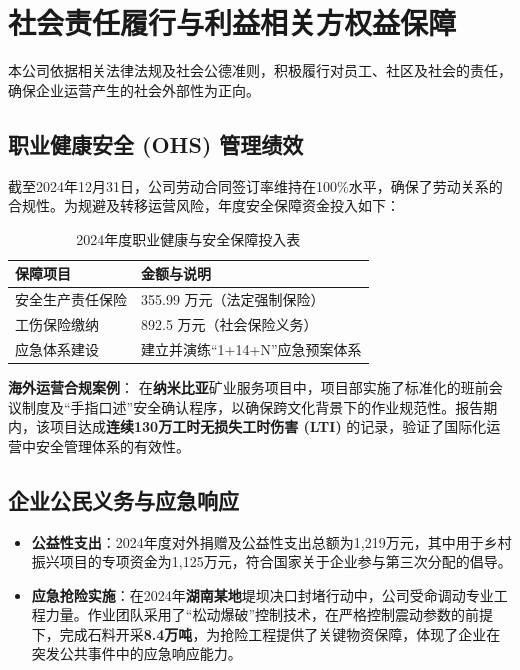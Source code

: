 \documentclass[a4paper,12pt]{article}
\begin{document}
\section{社会责任履行与利益相关方权益保障}

本公司依据相关法律法规及社会公德准则，积极履行对员工、社区及社会的责任，确保企业运营产生的社会外部性为正向。

\subsection{职业健康安全 (OHS) 管理绩效}

截至2024年12月31日，公司劳动合同签订率维持在100\%水平，确保了劳动关系的合规性。为规避及转移运营风险，年度安全保障资金投入如下：

\begin{table}[H]
\centering
\caption{2024年度职业健康与安全保障投入表}
\begin{tabular}{@{}ll@{}}
\toprule
\textbf{保障项目} & \textbf{金额与说明} \\ \midrule
安全生产责任保险 & 355.99 万元（法定强制保险） \\
工伤保险缴纳 & 892.5 万元（社会保险义务） \\
应急体系建设 & 建立并演练“1+14+N”应急预案体系 \\ \bottomrule
\end{tabular}
\end{table}

\textbf{海外运营合规案例}：
在\textbf{纳米比亚}矿业服务项目中，项目部实施了标准化的班前会议制度及“手指口述”安全确认程序，以确保跨文化背景下的作业规范性。报告期内，该项目达成\textbf{连续130万工时无损失工时伤害 (LTI)} 的记录，验证了国际化运营中安全管理体系的有效性。

\subsection{企业公民义务与应急响应}

\begin{itemize}
    \item \textbf{公益性支出}：2024年度对外捐赠及公益性支出总额为1,219万元，其中用于乡村振兴项目的专项资金为1,125万元，符合国家关于企业参与第三次分配的倡导。
    \item \textbf{应急抢险实施}：在2024年\textbf{湖南某地}堤坝决口封堵行动中，公司受命调动专业工程力量。作业团队采用了“松动爆破”控制技术，在严格控制震动参数的前提下，完成石料开采\textbf{8.4万吨}，为抢险工程提供了关键物资保障，体现了企业在突发公共事件中的应急响应能力。
\end{itemize}
\end{document}
